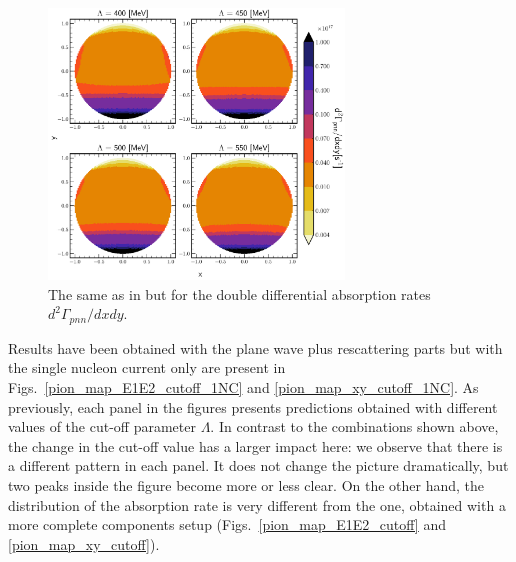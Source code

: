     \begin{figure}[h]
        \begin{center}
        \includegraphics[width=0.7\textwidth]{PlotData/PION/Dalitz_maps/figures/Dalitz_map_pnn_xy_cutofs_PWIAS.pdf}
        \end{center}
        \caption{The same as in  but for the double differential absorption rates
        $d^2 \Gamma_{pnn}/dxdy$.}
        \label{pion_map_xy_cutoff_PW}
    \end{figure}

    Results have been obtained with the plane wave plus rescattering parts but with the single nucleon current only
    are present in Figs.~\ref{pion_map_E1E2_cutoff_1NC} and \ref{pion_map_xy_cutoff_1NC}.
    As previously, each panel in the figures presents predictions obtained with different values of the cut-off parameter $\Lambda$.
    In contrast to the combinations shown above, the change in the cut-off value has a larger impact here:
    we observe that there is a different pattern in each panel.
    It does not change the picture dramatically, but 
    two peaks inside the figure become more or less clear. On the other hand, the distribution of 
    the absorption rate is very different from the one, obtained with a more complete components setup 
    (Figs.~\ref{pion_map_E1E2_cutoff} and \ref{pion_map_xy_cutoff}).


